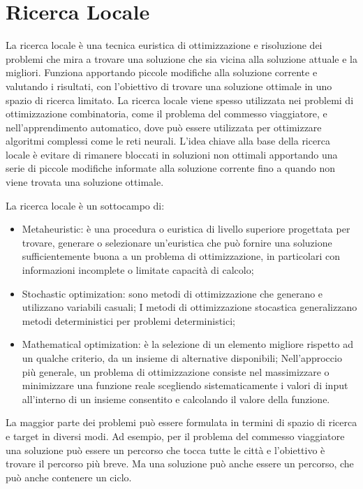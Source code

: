 \section{Ricerca Locale}\label{sec:cap_sec_subsec}
La ricerca locale è una tecnica euristica di ottimizzazione e risoluzione dei problemi che mira a trovare una soluzione che sia vicina alla soluzione attuale e la migliori. 
Funziona apportando piccole modifiche alla soluzione corrente e valutando i risultati, con l'obiettivo di trovare una soluzione ottimale in uno spazio di ricerca 
limitato. La ricerca locale viene spesso utilizzata nei problemi di ottimizzazione combinatoria, come il problema del commesso viaggiatore, e nell'apprendimento 
automatico, dove può essere utilizzata per ottimizzare algoritmi complessi come le reti neurali. L'idea chiave alla base della ricerca locale è evitare di rimanere 
bloccati in soluzioni non ottimali apportando una serie di piccole modifiche informate alla soluzione corrente fino a quando non viene trovata una soluzione ottimale.

La ricerca locale è un sottocampo di:
\vspace{10pt}
\begin{itemize}
    \item Metaheuristic: è una procedura o euristica di livello superiore progettata per trovare, generare o selezionare un'euristica che può fornire una soluzione
    sufficientemente buona a un problema di ottimizzazione, in particolari con informazioni incomplete o limitate capacità di calcolo;
    \vspace{5pt}
    \item Stochastic optimization: sono metodi di ottimizzazione che generano e utilizzano variabili casuali; I metodi di ottimizzazione stocastica generalizzano metodi 
    deterministici per problemi deterministici;
    \vspace{5pt}
    \item Mathematical optimization: è la selezione di un elemento migliore rispetto ad un qualche criterio, da un insieme di alternative disponibili; Nell'approccio 
    più generale, un problema di ottimizzazione consiste nel massimizzare o minimizzare una funzione reale scegliendo sistematicamente i valori di input 
    all'interno di un insieme consentito e calcolando il valore della funzione.
\end{itemize}

La maggior parte dei problemi può essere formulata in termini di spazio di ricerca e target in diversi modi. Ad esempio, per il problema del commesso viaggiatore una 
soluzione può essere un percorso che tocca tutte le città e l'obiettivo è trovare il percorso più breve. Ma una soluzione può anche essere un percorso, che può anche 
contenere un ciclo.

